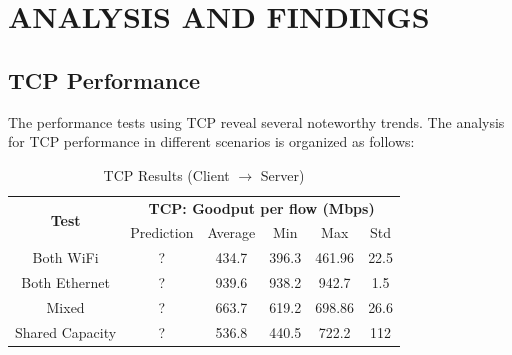 
\section{ANALYSIS AND FINDINGS} \label{sec:analysis-and-findings}

    \subsection{TCP Performance} \label{subsec:tcp-performance}

        The performance tests using TCP reveal several noteworthy trends. The analysis for TCP performance in different scenarios is organized as follows:

        \begin{table}
            \small
            \centering
            \begin{tabular}{|ll|lllll|}
            \hline
            \multicolumn{2}{|c|}{\multirow{2}{*}{\textbf{Test}}} & 
                \multicolumn{5}{c|}{\textbf{TCP: Goodput per flow (Mbps)}} \\
            \cline{3-7}
            \multicolumn{2}{|c|}{} &
                \multicolumn{1}{c|}{Prediction} &
                \multicolumn{1}{c|}{Average} &
                \multicolumn{1}{c|}{Min} &
                \multicolumn{1}{c|}{Max} &
                \multicolumn{1}{c|}{Std} \\
            \hline
            \multicolumn{2}{|c|}{Both WiFi} &
                \multicolumn{1}{c|}{?} &
                \multicolumn{1}{c|}{434.7} &
                \multicolumn{1}{c|}{396.3} &
                \multicolumn{1}{c|}{461.96} &
                \multicolumn{1}{c|}{22.5} \\
            \hline
            \multicolumn{2}{|c|}{Both Ethernet} &
                \multicolumn{1}{c|}{?} &
                \multicolumn{1}{c|}{939.6} &
                \multicolumn{1}{c|}{938.2} &
                \multicolumn{1}{c|}{942.7} &
                \multicolumn{1}{c|}{1.5} \\
            \hline
            \multicolumn{2}{|c|}{Mixed} &
                \multicolumn{1}{c|}{?} &
                \multicolumn{1}{c|}{663.7} &
                \multicolumn{1}{c|}{619.2} &
                \multicolumn{1}{c|}{698.86} &
                \multicolumn{1}{c|}{26.6} \\
            \hline
            \multicolumn{2}{|c|}{Shared Capacity} &
                \multicolumn{1}{c|}{?} &
                \multicolumn{1}{c|}{536.8} &
                \multicolumn{1}{c|}{440.5} &
                \multicolumn{1}{c|}{722.2} &
                \multicolumn{1}{c|}{112} \\
            \hline
            \end{tabular}
            \vspace{0.5cm}
            \caption{TCP Results (Client $\rightarrow$ Server)}
            \label{tab:tcp-results}
        \end{table}

